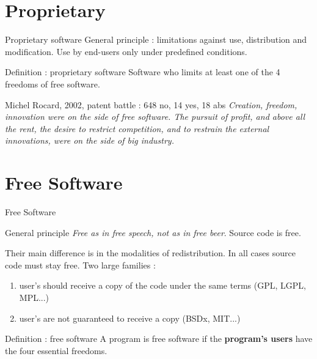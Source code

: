 \documentclass{beamer}
\begin{document}

\section{Proprietary}

\begin{frame}{Proprietary software}
  General principle : limitations against use, distribution and
  modification. Use by end-users only under predefined conditions.

  \begin{alertblock}{Definition : proprietary software}
    Software who limits at least one of the 4 freedoms of free
    software.
  \end{alertblock}

  \pause

  \begin{block}{Michel Rocard, 2002, patent battle : 648 no, 14 yes,
      18 abs}
    \textit{Creation, freedom, innovation were on the side of free
      software. The pursuit of profit, and above all the rent, the
      desire to restrict competition, and to restrain the external
      innovations, were on the side of big industry.}
  \end{block}
\end{frame}


\section{Free Software}


\begin{frame}{Free Software}

  \begin{alertblock}{General principle}
    \textit{Free as in free speech, not as in free beer}. Source code
    is free.
  \end{alertblock}

  Their main difference is in the modalities of redistribution. In all
  cases source code must stay free. Two large families :

  \begin{enumerate}
  \item user's should receive a copy of the code under the same terms
    (GPL, LGPL, MPL...)
  \item user's are not guaranteed to receive a copy (BSDx, MIT...)
  \end{enumerate}

  \begin{alertblock}{Definition : free software}
    A program is free software if the \textbf{program's users} have
    the four essential freedoms.
  \end{alertblock}
  
\end{frame}
\end{document}
